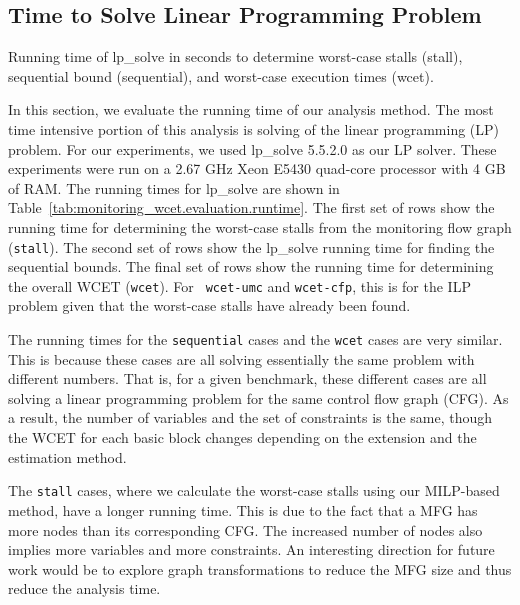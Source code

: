 \subsection{Time to Solve Linear Programming Problem}
\label{sec:monitoring_wcet.evaluation.lptime}

\begin{table}
  \begin{center}
    \begin{footnotesize}
    
    \end{footnotesize}
    \caption{Running time of lp\_solve in seconds to determine worst-case stalls
    (stall), sequential bound (sequential), and worst-case execution times (wcet).}
    \label{tab:monitoring_wcet.evaluation.runtime}
  \end{center}
\end{table}

In this section, we evaluate the running time of our analysis method.
The most time intensive portion of this analysis is solving of
the linear programming (LP) problem. For our experiments, we used lp\_solve
5.5.2.0 \cite{lpsolve} as our LP solver. These experiments were run on a 2.67
GHz Xeon E5430 quad-core processor with 4 GB of RAM. The running times for
lp\_solve are shown in Table~\ref{tab:monitoring_wcet.evaluation.runtime}.  The
first set of rows show the running time for determining the worst-case stalls
from the monitoring flow graph ({\tt stall}). The second set of rows show the
lp\_solve running time for finding the sequential bounds. The final set of rows
show the running time for determining the overall WCET ({\tt wcet}). For {\tt
wcet-umc} and {\tt wcet-cfp}, this is for the ILP problem given that the worst-case
stalls have already been found.

The running times for the {\tt sequential} cases and the {\tt wcet} cases are
very similar. This is because these cases are all solving essentially the same
problem with different numbers. That is, for a given benchmark, these different
cases are all solving a linear programming problem for the same control flow
graph (CFG). As a result, the number of variables and the set of constraints is
the same, though the WCET for each basic block changes depending on the
extension and the estimation method. 

The {\tt stall} cases, where we calculate the worst-case stalls using our
MILP-based method, have a longer running time. This is due to the fact that a
MFG has more nodes than its corresponding CFG. The increased number of nodes
also implies more variables and more constraints. An interesting direction for
future work would be to explore graph transformations to reduce the MFG size
and thus reduce the analysis time.


